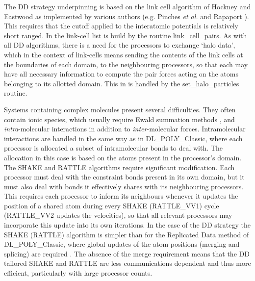 The DD strategy underpinning \D is based on the link cell
algorithm of Hockney and Eastwood \cite{hockney-81a} as
implemented by various authors (e.g. Pinches {\em et al.}
\cite{pinches-91a} and Rapaport \cite{rapaport-91b}).  This
requires that the cutoff applied to the interatomic potentials is
relatively short ranged.  In \D the link-cell list is build by the
routine {\sc link\_cell\_pairs}.  As with all DD algorithms, there
is a need for the processors to exchange `halo data', which in the
context of link-cells means sending the contents of the link cells
at the boundaries of each domain, to the neighbouring processors,
so that each may have all necessary information to compute the
pair forces acting on the atoms belonging to its allotted domain.
This in \D is handled by the {\sc set\_halo\_particles} routine.

Systems containing complex molecules present several difficulties.
They often contain ionic species, which usually require Ewald
summation methods \cite{allen-89a,smith-92b},
and {\em intra}-molecular interactions in addition to
{\em inter}-molecular forces.  Intramolecular interactions are
handled in the same way as in DL\_POLY\_Classic, where each processor
is allocated a subset of intramolecular bonds to deal with.  The
allocation in this case is based on the atoms present in the
processor's domain.  The SHAKE and
RATTLE algorithms \cite{ryckaert-77a,andersen-83a}
require significant modification.  Each processor must deal with
the constraint bonds present in its own domain, but it must also
deal with bonds it effectively shares with its neighbouring
processors.  This requires each processor to inform its neighbours
whenever it updates the position of a shared atom during every
SHAKE (RATTLE\_VV1) cycle (RATTLE\_VV2 updates the velocities),
so that all relevant processors may incorporate this update into
its own iterations.  In the case of the DD strategy the SHAKE
(RATTLE) algorithm is simpler than for the Replicated Data method
of DL\_POLY\_Classic, where global updates of the atom positions
(merging and splicing) are required \cite{smith-93b}.  The
absence of the merge requirement means that the DD tailored
SHAKE and RATTLE are less communications dependent and thus more
efficient, particularly with large processor counts.

